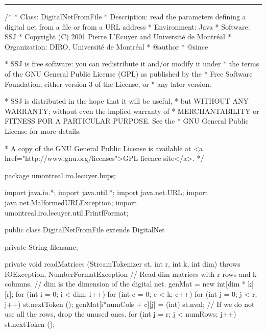 \bigskip\hrule\bigskip

\begin{code}
\begin{hide}
/*
 * Class:        DigitalNetFromFile
 * Description:  read the parameters defining a digital net from a file
                 or from a URL address
 * Environment:  Java
 * Software:     SSJ 
 * Copyright (C) 2001  Pierre L'Ecuyer and Université de Montréal
 * Organization: DIRO, Université de Montréal
 * @author       
 * @since

 * SSJ is free software: you can redistribute it and/or modify it under
 * the terms of the GNU General Public License (GPL) as published by the
 * Free Software Foundation, either version 3 of the License, or
 * any later version.

 * SSJ is distributed in the hope that it will be useful,
 * but WITHOUT ANY WARRANTY; without even the implied warranty of
 * MERCHANTABILITY or FITNESS FOR A PARTICULAR PURPOSE.  See the
 * GNU General Public License for more details.

 * A copy of the GNU General Public License is available at
   <a href="http://www.gnu.org/licenses">GPL licence site</a>.
 */
\end{hide}
package umontreal.iro.lecuyer.hups;\begin{hide}

import java.io.*;
import java.util.*;
import java.net.URL;
import java.net.MalformedURLException;
import umontreal.iro.lecuyer.util.PrintfFormat;
\end{hide}

public class DigitalNetFromFile extends DigitalNet \begin{hide} {
   private String filename;

   private void readMatrices (StreamTokenizer st,
                              int r, int k, int dim)
      throws IOException, NumberFormatException {
      // Read dim matrices with r rows and k columns.
      // dim is the dimension of the digital net.
      genMat = new int[dim * k][r];
      for (int i = 0; i < dim; i++)
         for (int c = 0; c < k; c++) {
             for (int j = 0; j < r; j++) {
                 st.nextToken ();
                 genMat[i*numCols + c][j]  = (int) st.nval;
             }
             // If we do not use all the rows, drop the unused ones.
             for (int j = r; j < numRows; j++) {
                 st.nextToken ();
             }
         }
   }


}
\end{hide}
\end{code}
